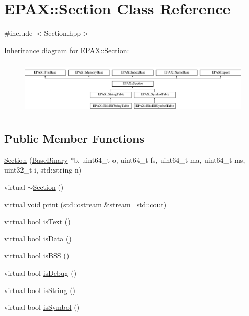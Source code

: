 \hypertarget{class_e_p_a_x_1_1_section}{\section{\-E\-P\-A\-X\-:\-:\-Section \-Class \-Reference}
\label{class_e_p_a_x_1_1_section}
}


{\ttfamily \#include $<$\-Section.\-hpp$>$}

\-Inheritance diagram for \-E\-P\-A\-X\-:\-:\-Section\-:\begin{figure}[H]
\begin{center}
\leavevmode
\includegraphics[height=2.666667cm]{class_e_p_a_x_1_1_section}
\end{center}
\end{figure}
\subsection*{\-Public \-Member \-Functions}
\begin{DoxyCompactItemize}
\item 
\hyperlink{class_e_p_a_x_1_1_section_a90d6591d88f81dadbc86b93a53954eee}{\-Section} (\hyperlink{class_e_p_a_x_1_1_base_binary}{\-Base\-Binary} $\ast$b, uint64\-\_\-t o, uint64\-\_\-t fs, uint64\-\_\-t ma, uint64\-\_\-t ms, uint32\-\_\-t i, std\-::string n)
\item 
virtual \hyperlink{class_e_p_a_x_1_1_section_ad7eeb2596e6e8070b0ffa495c849c214}{$\sim$\-Section} ()
\item 
virtual void \hyperlink{class_e_p_a_x_1_1_section_ad79a91be22efd4499b78d2554ebc8285}{print} (std\-::ostream \&stream=std\-::cout)
\item 
virtual bool \hyperlink{class_e_p_a_x_1_1_section_a368308eb714d2e274ac82c1a92824b28}{is\-Text} ()
\item 
virtual bool \hyperlink{class_e_p_a_x_1_1_section_a90db97c9ef10f64fad4a339a2c3b128c}{is\-Data} ()
\item 
virtual bool \hyperlink{class_e_p_a_x_1_1_section_a0518a2160f8bd57836b8f9823993376c}{is\-B\-S\-S} ()
\item 
virtual bool \hyperlink{class_e_p_a_x_1_1_section_a43c6a0b55e15f24689838084c97cffe8}{is\-Debug} ()
\item 
virtual bool \hyperlink{class_e_p_a_x_1_1_section_a04c811caf98179122fa6443095bde52d}{is\-String} ()
\item 
virtual bool \hyperlink{class_e_p_a_x_1_1_section_a6f8fdba06c4f3506d4dc2df97658157f}{is\-Symbol} ()
\end{DoxyCompactItemize}


